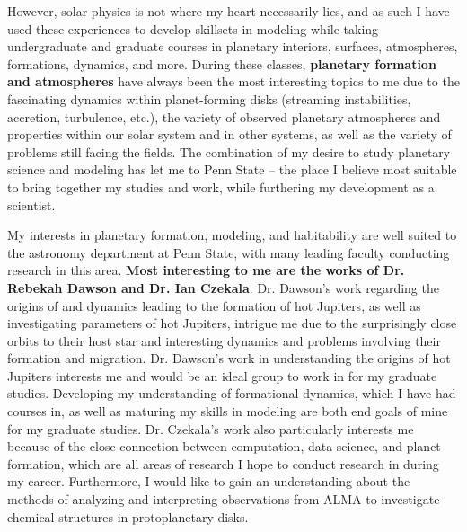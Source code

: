 \documentclass[12pt,letterpaper]{article}
\begin{document}
However, solar physics is not where my heart necessarily lies, and as such I have used these experiences to develop skillsets in modeling while taking undergraduate and graduate courses in planetary interiors, surfaces, atmospheres, formations, dynamics, and more. During these classes, \textbf{planetary formation and atmospheres} have always been the most interesting topics to me due to the fascinating dynamics within planet-forming disks (streaming instabilities, accretion, turbulence, etc.), the variety of observed planetary atmospheres and properties within our solar system and in other systems, as well as the variety of problems still facing the fields. The combination of my desire to study planetary science and modeling has let me to Penn State -- the place I believe most suitable to bring together my studies and work, while furthering my development as a scientist.

My interests in planetary formation, modeling, and habitability are well suited to the astronomy department at Penn State, with many leading faculty conducting research in this area. \textbf{Most interesting to me are the works of Dr. Rebekah Dawson and Dr. Ian Czekala}. Dr. Dawson's work regarding the origins of and dynamics leading to the formation of hot Jupiters, as well as investigating parameters of hot Jupiters, intrigue me due to the surprisingly close orbits to their host star and interesting dynamics and problems involving their formation and migration. Dr. Dawson's work in understanding the origins of hot Jupiters interests me and would be an ideal group to work in for my graduate studies. Developing my understanding of formational dynamics, which I have had courses in, as well as maturing my skills in modeling are both end goals of mine for my graduate studies. Dr. Czekala's work also particularly interests me because of the close connection between computation, data science, and planet formation, which are all areas of research I hope to conduct research in during my career. Furthermore, I would like to gain an understanding about the methods of analyzing and interpreting observations from ALMA to investigate chemical structures in protoplanetary disks.
\end{document}
